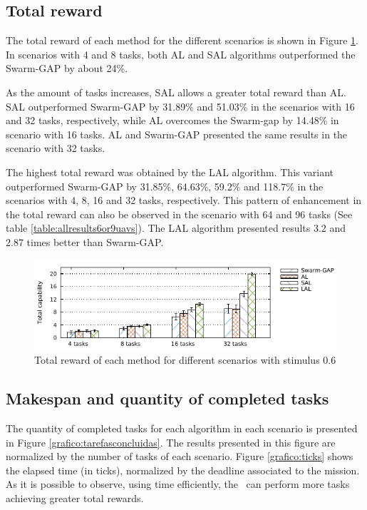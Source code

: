 \subsection{Total reward}

The total reward of each method for the different scenarios is shown in Figure \ref{grafico:total_capability}. In scenarios with 4 and 8 tasks, both AL and SAL algorithms outperformed the Swarm-GAP by about 24\%.

As the amount of tasks increases, SAL allows a greater total reward than AL. SAL outperformed Swarm-GAP by 31.89\% and 51.03\% in the scenarios with 16 and 32 tasks, respectively, while AL overcomes the Swarm-gap by 14.48\% in scenario with 16 tasks. AL and Swarm-GAP presented the same results in the scenario with 32 tasks.

The highest total reward was obtained by the LAL algorithm. This variant outperformed Swarm-GAP by 31.85\%, 64.63\%, 59.2\% and 118.7\% in the scenarios with 4, 8, 16 and 32 tasks, respectively. This pattern of enhancement in the total reward can also be observed in the scenario with 64 and 96 tasks (See table \ref{table:allresults6or9uavs}). The LAL algorithm presented results 3.2 and 2.87 times better than Swarm-GAP.

%
\begin{figure}[h]
	\begin{center}
		\includegraphics[scale=1.00]{total_capability.pdf}
		\caption{Total reward of each method for different scenarios with stimulus 0.6}
		\label{grafico:total_capability}
	\end{center}
\end{figure}

\subsection{Makespan and quantity of completed tasks}

The quantity of completed tasks for each algorithm in each scenario is presented in Figure \ref{grafico:tarefasconcluidas}. 
The results presented in this figure are normalized by the number of tasks of each scenario. Figure \ref{grafico:ticks} shows the elapsed time (in ticks), normalized by the deadline associated to the mission. 
As it is possible to observe, using time efficiently, the \uavs\ can perform more tasks achieving greater total rewards.

